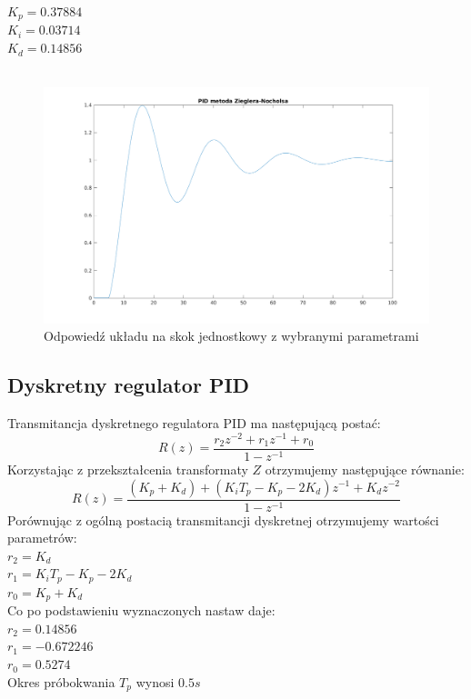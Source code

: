 \documentclass[a4paper, 11pt]{article}
\begin{document}
$K_p = 0.37884$\\
\indent$K_i = 0.03714$\\
\indent$K_d = 0.14856$\\
\\

\begin{figure}[htp]
\centering
\includegraphics[scale=0.60]{2_1.png}
\caption{Odpowiedź układu na skok jednostkowy z wybranymi parametrami}
\label{}
\end{figure}

\subsection{Dyskretny regulator PID}
Transmitancja dyskretnego regulatora PID ma następującą postać: 
$$R(z) = \frac{r_2z^{-2} + r_1z^{-1} + r_0}{1-z^{-1}}$$
Korzystając z przekształcenia transformaty $Z$ otrzymujemy następujące równanie: 
$$R(z) = \frac{(K_p+K_d)+(K_iT_p-K_p-2K_d)z^{-1} + K_dz^{-2}}{1-z^{-1}}$$
Porównując z ogólną postacią transmitancji dyskretnej otrzymujemy wartości parametrów: \\

$r_2 = K_d$\\
\indent$r_1 = K_iT_p -K_p-2K_d$\\
\indent$r_0 = K_p + K_d$\\

\noindent Co po podstawieniu wyznaczonych nastaw daje: \\

$r_2 = 0.14856$\\ 
\indent $r_1 = -0.672246$\\
\indent $r_0 = 0.5274$\\

Okres próbokwania $T_p$ wynosi $0.5s$
\end{document}
